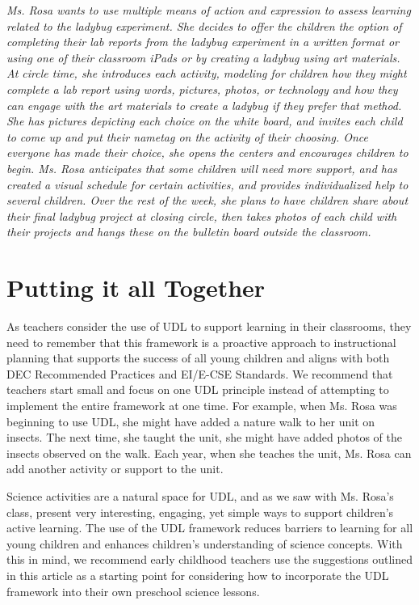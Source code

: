 \documentclass[11.5pt]{sig-alternate}
\begin{document}
\begin{large}
\textit{Ms. Rosa wants to use multiple means of action and expression to assess learning related to the ladybug experiment. She decides to offer the children the option of completing their lab reports from the ladybug experiment in a written format or using one of their classroom iPads or by creating a ladybug using art materials. At circle time, she introduces each activity, modeling for children how they might complete a lab report using words, pictures, photos, or technology and how they can engage with the art materials to create a ladybug if they prefer that method. She has pictures depicting each choice on the white board, and invites each child to come up and put their nametag on the activity of their choosing. Once everyone has made their choice, she opens the centers and encourages children to begin. Ms. Rosa anticipates that some children will need more support, and has created a visual schedule for certain activities, and provides individualized help to several children. Over the rest of the week, she plans to have children share about their final ladybug project at closing circle, then takes photos of each child with their projects and hangs these on the bulletin board outside the classroom.}

\section*{Putting it all Together}
As teachers consider the use of UDL to support learning in their classrooms, they need to remember that this framework is a proactive approach to instructional planning that supports the success of all young children and aligns with both DEC Recommended Practices and EI/E-CSE Standards. We recommend that teachers start small and focus on one UDL principle instead of attempting to implement the entire framework at one time. For example, when Ms. Rosa was beginning to use UDL, she might have added a nature walk to her unit on insects. The next time, she taught the unit, she might have added photos of the insects observed on the walk. Each year, when she teaches the unit, Ms. Rosa can add another activity or support to the unit. 

Science activities are a natural space for UDL, and as we saw with Ms. Rosa’s class, present very interesting, engaging, yet simple ways to support children’s active learning. The use of the UDL framework reduces barriers to learning for all young children and enhances children’s understanding of science concepts. With this in mind, we recommend early childhood teachers use the suggestions outlined in this article as a starting point for considering how to incorporate the UDL framework into their own preschool science lessons.

\end{large}
\newpage

\end{document}

